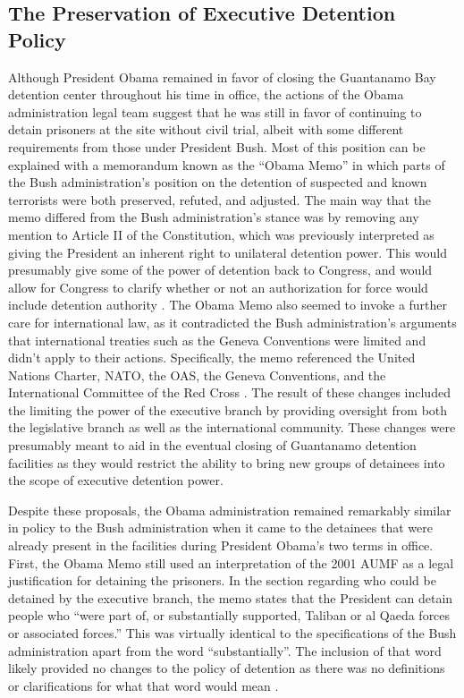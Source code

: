 \documentclass[12pt]{article}
\begin{document}
\subsection*{The Preservation of Executive Detention Policy}
Although President Obama remained in favor of closing the Guantanamo Bay detention center throughout his time in office, the actions of the Obama administration legal team suggest that he was still in favor of continuing to detain prisoners at the site without civil trial, albeit with some different requirements from those under President Bush.
Most of this position can be explained with a memorandum known as the ``Obama Memo'' in which parts of the Bush administration's position on the detention of suspected and known terrorists were both preserved, refuted, and adjusted.
The main way that the memo differed from the Bush administration's stance was by removing any mention to Article II of the Constitution, which was previously interpreted as giving the President an inherent right to unilateral detention power.
This would presumably give some of the power of detention back to Congress, and would allow for Congress to clarify whether or not an authorization for force would include detention authority \autocite[44]{brill2010}.
The Obama Memo also seemed to invoke a further care for international law, as it contradicted the Bush administration's arguments that international treaties such as the Geneva Conventions were limited and didn't apply to their actions.
Specifically, the memo referenced the United Nations Charter, NATO, the OAS, the Geneva Conventions, and the International Committee of the Red Cross \autocite[46]{brill2010}.
The result of these changes included the limiting the power of the executive branch by providing oversight from both the legislative branch as well as the international community.
These changes were presumably meant to aid in the eventual closing of Guantanamo detention facilities as they would restrict the ability to bring new groups of detainees into the scope of executive detention power.

Despite these proposals, the Obama administration remained remarkably similar in policy to the Bush administration when it came to the detainees that were already present in the facilities during President Obama's two terms in office.
First, the Obama Memo still used an interpretation of the 2001 AUMF as a legal justification for detaining the prisoners.
In the section regarding who could be detained by the executive branch, the memo states that the President can detain people who ``were part of, or substantially supported, Taliban or al Qaeda forces or associated forces.''
This was virtually identical to the specifications of the Bush administration apart from the word ``substantially''.
The inclusion of that word likely provided no changes to the policy of detention as there was no definitions or clarifications for what that word would mean \autocite[46]{brill2010}.
\end{document}
